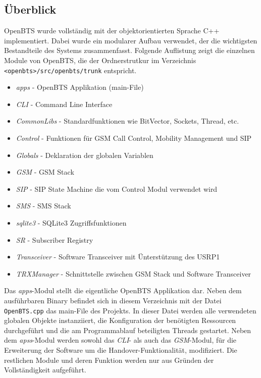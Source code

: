 \label{sec:swarch}

\subsection{Überblick}

OpenBTS wurde vollständig mit der objektorientierten Sprache C++ implementiert. Dabei wurde ein modularer Aufbau verwendet, der die wichtigsten Bestandteile des Systems zusammenfasst. Folgende Auflistung zeigt die einzelnen Module von OpenBTS, die der Ordnerstrutkur im Verzeichnis \lstinline{<openbts>/src/openbts/trunk} entspricht.

\begin{itemize}
 \item \textit{apps} - OpenBTS Applikation (main-File)
 \item \textit{CLI} - Command Line Interface
 \item \textit{CommonLibs} - Standardfunktionen wie BitVector, Sockets, Thread, etc.
 \item \textit{Control} - Funktionen für GSM Call Control, Mobility Management und SIP
 \item \textit{Globals} - Deklaration der globalen Variablen
 \item \textit{GSM} - GSM Stack
 \item \textit{SIP} - SIP State Machine die vom Control Modul verwendet wird
 \item \textit{SMS} - SMS Stack
 \item \textit{sqlite3} - SQLite3 Zugriffsfunktionen
 \item \textit{SR} - Subscriber Registry
 \item \textit{Transceiver} - Software Transceiver mit Ünterstützung des USRP1
 \item \textit{TRXManager} - Schnittstelle zwischen GSM Stack und Software Transceiver
\end{itemize}

Das \textit{apps}-Modul stellt die eigentliche OpenBTS Applikation dar. Neben dem ausführbaren Binary befindet sich in diesem Verzeichnis mit der Datei \lstinline{OpenBTS.cpp} das main-File des Projekts. In dieser Datei werden alle verwendeten globalen Objekte instanziiert, die Konfiguration der benötigten Ressourcen durchgeführt und die am Programmablauf beteiligten Threads gestartet. Neben dem \textit{apss}-Modul werden sowohl das \textit{CLI}- als auch das \textit{GSM}-Modul, für die Erweiterung der Software um die Handover-Funktionalität, modifiziert. Die restlichen Module und deren Funktion werden nur aus Gründen der Vollständigkeit aufgeführt.

